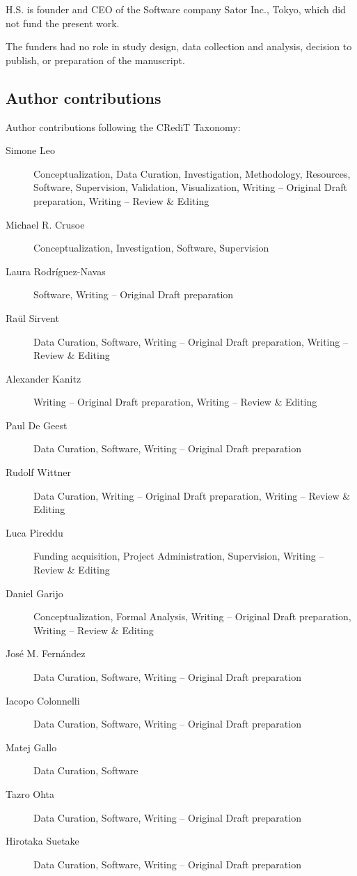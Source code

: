 \documentclass[10pt,letterpaper]{article}
\begin{document}
H.S. is founder and CEO of the Software company Sator Inc., Tokyo, which did not fund the present work.

The funders had no role in study design, data collection and analysis, decision to publish, or preparation of the manuscript.

\subsection*{Author contributions}
Author contributions following the CRediT Taxonomy:

\begin{description}
\item[Simone Leo]
Conceptualization, Data Curation, Investigation, Methodology, Resources, Software, Supervision, Validation, Visualization, Writing -- Original Draft preparation, Writing -- Review \& Editing
\item[Michael R. Crusoe]
Conceptualization, Investigation, Software, Supervision
\item[Laura Rodríguez-Navas]
Software, Writing -- Original Draft preparation
\item[Raül Sirvent]
Data Curation, Software, Writing -- Original Draft preparation, Writing -- Review \& Editing
\item[Alexander Kanitz]
Writing -- Original Draft preparation, Writing -- Review \& Editing
\item[Paul De Geest]
Data Curation, Software, Writing -- Original Draft preparation
\item[Rudolf Wittner]
Data Curation, Writing -- Original Draft preparation, Writing -- Review \& Editing
\item[Luca Pireddu]
Funding acquisition, Project Administration, Supervision, Writing -- Review \& Editing
\item[Daniel Garijo]
Conceptualization, Formal Analysis, Writing -- Original Draft preparation, Writing -- Review \& Editing
\item[José M. Fernández]
Data Curation, Software, Writing -- Original Draft preparation
\item[Iacopo Colonnelli]
Data Curation, Software, Writing -- Original Draft preparation
\item[Matej Gallo]
Data Curation, Software
\item[Tazro Ohta]
Data Curation, Software, Writing -- Original Draft preparation
\item[Hirotaka Suetake]
Data Curation, Software, Writing -- Original Draft preparation

\end{description}
\end{document}
